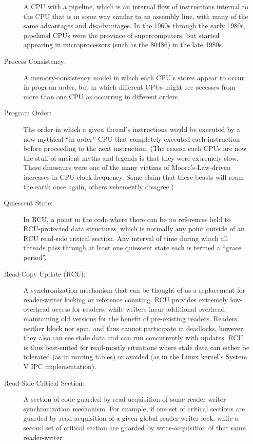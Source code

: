\begin{description}
	A CPU with a pipeline, which is
	an internal flow of instructions internal to the CPU that
	is in some way similar to an assembly line, with many of
	the same advantages and disadvantages.
	In the 1960s through the early 1980s, pipelined CPUs were the
	province of supercomputers, but started appearing in microprocessors
	(such as the 80486) in the late 1980s.
\item[Process Consistency:]
	A memory-consistency model in which each CPU's stores appear to
	occur in program order, but in which different CPUs might see
	accesses from more than one CPU as occurring in different orders.
\item[Program Order:]
	The order in which a given thread's instructions
	would be executed by a now-mythical ``in-order'' CPU that
	completely executed each instruction before proceeding to
	the next instruction.
	(The reason such CPUs are now the stuff of ancient myths
	and legends is that they were extremely slow.
	These dinosaurs were one of the many victims of
	Moore's-Law-driven increases in CPU clock frequency.
	Some claim that these beasts will roam the earth once again,
	others vehemently disagree.)
\item[Quiescent State:]
	In RCU, a point in the code where there can be no references held
	to RCU-protected data structures, which is normally any point
	outside of an RCU read-side critical section.
	Any interval of time during which all threads pass through at
	least one quiescent state each is termed a ``grace period''.
\item[Read-Copy Update (RCU):]
	A synchronization mechanism that can be thought of as a replacement
	for reader-writer locking or reference counting.
	RCU provides extremely low-overhead access for readers, while
	writers incur additional overhead maintaining old versions
	for the benefit of pre-existing readers.
	Readers neither block nor spin, and thus cannot participate in
	deadlocks, however, they also can see stale data and can
	run concurrently with updates.
	RCU is thus best-suited for read-mostly situations where
	stale data can either be tolerated (as in routing tables)
	or avoided (as in the Linux kernel's System V IPC implementation).
\item[Read-Side Critical Section:]
	A section of code guarded by read-acquisition of
	some reader-writer synchronization mechanism.
	For example, if one set of critical sections are guarded by
	read-acquisition of
	a given global reader-writer lock, while a second set of critical
	section are guarded by write-acquisition of that same reader-writer

\end{description}
